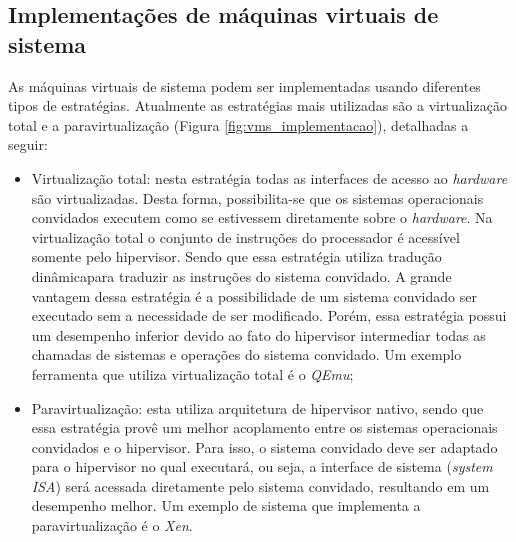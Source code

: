 

\subsection{Implementações de máquinas virtuais de sistema}
\label{section:virtestrat}

As máquinas virtuais de sistema podem ser implementadas usando diferentes tipos de estratégias. Atualmente as estratégias mais utilizadas
são a virtualização total e a paravirtualização (Figura \ref{fig:vms_implementacao}), detalhadas a seguir:
\begin{itemize}
 \item Virtualização total: nesta estratégia todas as interfaces de acesso ao \textit{hardware} são virtualizadas. Desta forma, possibilita-se 
 que os sistemas operacionais convidados executem como se estivessem diretamente sobre o \textit{hardware}. Na virtualização total o conjunto de 
 instruções do processador é acessível somente pelo hipervisor. Sendo que essa estratégia utiliza tradução dinâmica\footnotemark[1]
 para traduzir as instruções do sistema convidado. A grande vantagem dessa estratégia é a possibilidade de um sistema convidado ser executado 
 sem a necessidade de ser modificado. Porém, essa estratégia possui um desempenho inferior devido ao fato do hipervisor intermediar todas as 
 chamadas de sistemas e operações do sistema convidado. Um exemplo ferramenta que utiliza virtualização total é o \textit{QEmu};
 \item Paravirtualização: esta utiliza arquitetura de hipervisor nativo, sendo que essa estratégia provê um melhor acoplamento entre os 
 sistemas operacionais convidados e o hipervisor. Para isso, o sistema convidado deve ser adaptado para o hipervisor no qual executará, 
 ou seja, a interface de sistema (\textit{system ISA}) será acessada diretamente pelo sistema convidado, resultando em um desempenho melhor. 
 Um exemplo de sistema que implementa a paravirtualização é o \textit{Xen}.
\end{itemize}

